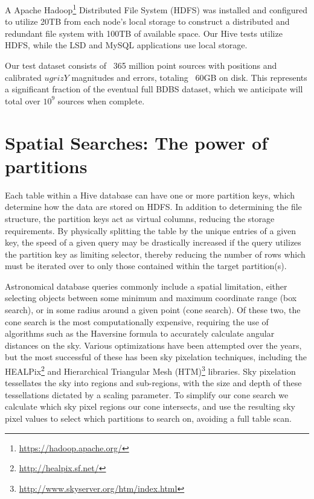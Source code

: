\documentclass[11pt,twoside]{article}
\begin{document}
A Apache Hadoop\footnote{\url{https://hadoop.apache.org/}} Distributed File System (HDFS) was installed and configured to utilize 20TB from each node's local storage to construct a distributed and redundant file system with 100TB of available space.  Our Hive tests utilize HDFS, while the LSD and MySQL applications use local storage.  

Our test dataset consists of ~365 million point sources with positions and calibrated $ugrizY$ magnitudes and errors, totaling ~60GB on disk.  This represents a significant fraction of the eventual full BDBS dataset, which we anticipate will total over $10^9$ sources when complete.


\section{Spatial Searches: The power of partitions}
\label{spatial}
Each table within a Hive database can have one or more partition keys, which determine how the data are stored on HDFS.  In addition to determining the file structure, the partition keys act as virtual columns, reducing the storage requirements.  By physically splitting the table by the unique entries of a given key, the speed of a given query may be drastically increased if the query utilizes the partition key as limiting selector, thereby reducing the number of rows which must be iterated over to only those contained within the target partition(s).

Astronomical database queries commonly include a spatial limitation, either selecting objects between some minimum and maximum coordinate range (box search), or in some radius around a given point (cone search).  Of these two, the cone search is the most computationally expensive, requiring the use of algorithms such as the Haversine formula to accurately calculate angular distances on the sky.  Various optimizations have been attempted over the years, but the most successful of these has been sky pixelation techniques, including the HEALPix\footnote{\url{http://healpix.sf.net/}} and Hierarchical Triangular Mesh (HTM)\footnote{\url{http://www.skyserver.org/htm/index.html}} libraries.  Sky pixelation tessellates the sky into regions and sub-regions, with the size and depth of these tessellations dictated by a scaling parameter.  To simplify our cone search we calculate which sky pixel regions our cone intersects, and use the resulting sky pixel values to select which partitions to search on, avoiding a full table scan.
\end{document}
